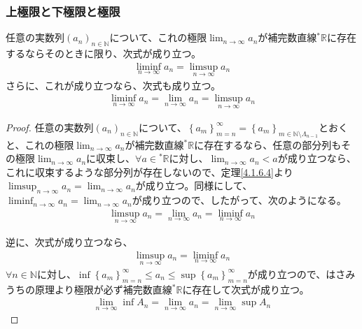 \documentclass[dvipdfmx]{jsarticle}
\begin{document}
\subsubsection{上極限と下極限と極限}%
\begin{thm}\label{4.1.6.5}
任意の実数列$\left( a_{n} \right)_{n \in \mathbb{N}}$について、これの極限$\lim_{n \rightarrow \infty}a_{n}$が補完数直線${}^{*}\mathbb{R}$に存在するならそのときに限り、次式が成り立つ。
\begin{align*}
\liminf_{n \rightarrow \infty}a_{n} = \limsup_{n \rightarrow \infty}a_{n}
\end{align*}
さらに、これが成り立つなら、次式も成り立つ。
\begin{align*}
\liminf_{n \rightarrow \infty}a_{n} = \lim_{n \rightarrow \infty}a_{n} = \limsup_{n \rightarrow \infty}a_{n}
\end{align*}
\end{thm}
\begin{proof}
任意の実数列$\left( a_{n} \right)_{n \in \mathbb{N}}$について、$\left\{ a_{m} \right\}_{m = n}^{\infty} = \left\{ a_{m} \right\}_{m \in \mathbb{N} \setminus \varLambda_{n - 1}}$とおくと、これの極限$\lim_{n \rightarrow \infty}a_{n}$が補完数直線${}^{*}\mathbb{R}$に存在するなら、任意の部分列もその極限$\lim_{n \rightarrow \infty}a_{n}$に収束し、$\forall a \in{}^{*}\mathbb{R}$に対し、$\lim_{n \rightarrow \infty}a_{n} < a$が成り立つなら、これに収束するような部分列が存在しないので、定理\ref{4.1.6.4}より$\limsup_{n \rightarrow \infty}a_{n} = \lim_{n \rightarrow \infty}a_{n}$が成り立つ。同様にして、$\liminf_{n \rightarrow \infty}a_{n} = \lim_{n \rightarrow \infty}a_{n}$が成り立つので、したがって、次のようになる。
\begin{align*}
\limsup_{n \rightarrow \infty}a_{n} = \lim_{n \rightarrow \infty}a_{n} = \liminf_{n \rightarrow \infty}a_{n}
\end{align*}\par
逆に、次式が成り立つなら、
\begin{align*}
\limsup_{n \rightarrow \infty}a_{n} = \liminf_{n \rightarrow \infty}a_{n}
\end{align*}
$\forall n \in \mathbb{N}$に対し、$\inf\left\{ a_{m} \right\}_{m = n}^{\infty} \leq a_{n} \leq \sup\left\{ a_{m} \right\}_{m = n}^{\infty}$が成り立つので、はさみうちの原理より極限が必ず補完数直線${}^{*}\mathbb{R}$に存在して次式が成り立つ。
\begin{align*}
\lim_{n \rightarrow \infty}{\inf A_{n}} = \lim_{n \rightarrow \infty}a_{n} = \lim_{n \rightarrow \infty}{\sup A_{n}}
\end{align*}
\end{proof}
\end{document}

